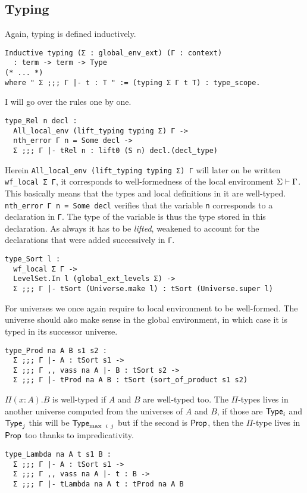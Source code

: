 \subsection{Typing}

Again, typing is defined inductively.
\begin{verbatim}
Inductive typing (Σ : global_env_ext) (Γ : context)
  : term -> term -> Type
(* ... *)
where " Σ ;;; Γ |- t : T " := (typing Σ Γ t T) : type_scope.
\end{verbatim}
I will go over the rules one by one.

\begin{verbatim}
type_Rel n decl :
  All_local_env (lift_typing typing Σ) Γ ->
  nth_error Γ n = Some decl ->
  Σ ;;; Γ |- tRel n : lift0 (S n) decl.(decl_type)
\end{verbatim}
Herein \texttt{All_local_env (lift_typing typing Σ) Γ} will later on
be written \texttt{wf_local Σ Γ}, it corresponds to well-formedness
of the local environment \(\Sigma \vdash \Gamma\). This basically means that
the types and local definitions in it are well-typed.
\texttt{nth_error Γ n = Some decl} verifies that the variable
\texttt{n} corresponds to a declaration in \texttt{Γ}.
The type of the variable is thus the type stored in this declaration. As always
it has to be \emph{lifted}, \ie weakened to account for the declarations
that were added successively in \texttt{Γ}.

\begin{verbatim}
type_Sort l :
  wf_local Σ Γ ->
  LevelSet.In l (global_ext_levels Σ) ->
  Σ ;;; Γ |- tSort (Universe.make l) : tSort (Universe.super l)
\end{verbatim}
For universes we once again require to local environment to be well-formed.
The universe should also make sense in the global environment, in which case it
is typed in its successor universe.

\begin{verbatim}
type_Prod na A B s1 s2 :
  Σ ;;; Γ |- A : tSort s1 ->
  Σ ;;; Γ ,, vass na A |- B : tSort s2 ->
  Σ ;;; Γ |- tProd na A B : tSort (sort_of_product s1 s2)
\end{verbatim}
\(\Pi (x:A).B\) is well-typed if \(A\) and \(B\) are well-typed too.
The \(\Pi\)-types lives in another universe computed from the universes of
\(A\) and \(B\), if those are \(\mathsf{Type}_i\) and \(\mathsf{Type}_j\) this will be
\(\mathsf{Type}_{\max\ i\ j}\) but if the second is \(\mathsf{Prop}\), then the \(\Pi\)-type
lives in \(\mathsf{Prop}\) too thanks to impredicativity.

\begin{verbatim}
type_Lambda na A t s1 B :
  Σ ;;; Γ |- A : tSort s1 ->
  Σ ;;; Γ ,, vass na A |- t : B ->
  Σ ;;; Γ |- tLambda na A t : tProd na A B
\end{verbatim}

